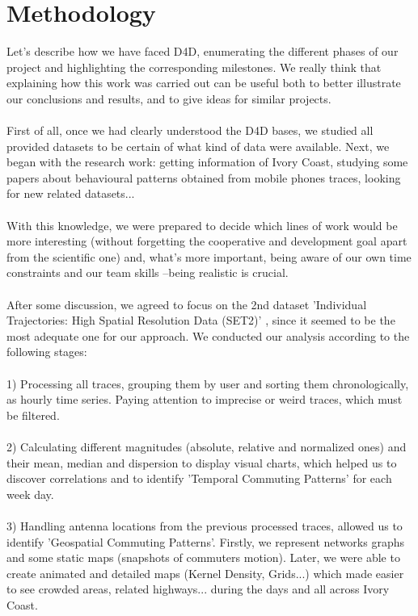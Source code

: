 \newpage

\section{Methodology}

Let's describe how we have faced D4D, enumerating the different phases of our project and highlighting the corresponding milestones. We really think that explaining how this work was carried out can be useful both to better illustrate our conclusions and results, and to give ideas for similar projects.
\\
\\
First of all, once we had clearly understood the D4D bases, we studied all provided datasets to be certain of what kind of data were available. Next, we began with the research work: getting information of Ivory Coast, studying some papers about behavioural patterns obtained from mobile phones traces, looking for new related datasets...
\\
\\
With this knowledge, we were prepared to decide which lines of work would be more interesting (without forgetting the cooperative and development goal apart from the scientific one) and, what's more important, being aware of our own time constraints and our team skills --being realistic is crucial.
\\
\\
After some discussion, we agreed to focus on the 2nd dataset 'Individual Trajectories: High Spatial Resolution Data (SET2)' \citep{DBLP:journals/corr/abs-1210-0137} , since it seemed to be the most adequate one for our approach. We conducted our analysis according to the following stages:
\\
\\
1) Processing all traces, grouping them by user and sorting them chronologically, as hourly time series. Paying attention to imprecise or weird traces, which must be filtered.
\\
\\
2) Calculating different magnitudes (absolute, relative and normalized ones) and their mean, median and dispersion to display visual charts, which helped us to discover correlations and to identify 'Temporal Commuting Patterns' for each week day.
\\
\\
3) Handling antenna locations from the previous processed traces, allowed us to identify 'Geospatial Commuting Patterns'. Firstly, we represent networks graphs and some static maps (snapshots of commuters motion). Later, we were able to create animated and detailed maps (Kernel Density, Grids...) which made easier to see crowded areas, related highways... during the days and all across Ivory Coast.
